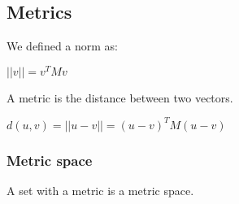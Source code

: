
\subsection{Metrics}

We defined a norm as:

\(||v||=v^TMv\)

A metric is the distance between two vectors.

\(d(u,v)=||u-v||=(u-v)^TM(u-v)\)

\subsubsection{Metric space}

A set with a metric is a metric space.


